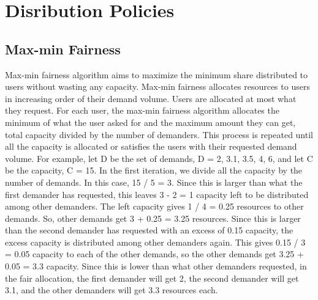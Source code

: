 \documentclass[a4paper,12pt]{report}
\begin{document}
\section{Disribution Policies}
\subsection{Max-min Fairness}
Max-min fairness algorithm aims to maximize the minimum share distributed to users without wasting any capacity. 
Max-min fairness allocates resources to users in increasing order of their demand volume. Users are allocated at most what they request. For each user, the max-min fairness algorithm allocates the minimum of what the user asked for and the maximum amount they can get, total capacity divided by the number of demanders. This process is repeated until all the capacity is allocated or satisfies the users with their requested demand volume.
For example, let D be the set of demands, D = {2, 3.1, 3.5, 4, 6}, and let C be the capacity, C = 15. In the first iteration, we divide all the capacity by the number of demands. In this case, 15 / 5 = 3. Since this is larger than what the first demander has requested, this leaves 3 - 2 = 1 capacity left to be distributed among other demanders. The left capacity gives 1 / 4 = 0.25 resources to other demands. So, other demands get 3 + 0.25 = 3.25 resources. Since this is larger than the second demander has requested with an excess of 0.15 capacity, the excess capacity is distributed among other demanders again. This gives 0.15 / 3 = 0.05 capacity to each of the other demands, so the other demands get 3.25 + 0.05 = 3.3 capacity. Since this is lower than what other demanders requested, in the fair allocation, the first demander will get 2, the second demander  will get 3.1, and the other demanders will get 3.3 resources each.
\newpage
\end{document}
